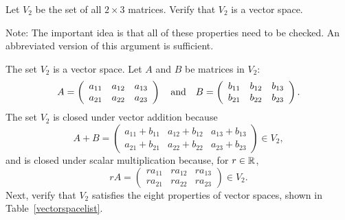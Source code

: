 \documentclass{ximera}
\begin{document}
\begin{exercise} \label{c5.1.2}
Let $V_2$ be the set of all $2\times 3$ matrices.   Verify that
$V_2$ is a vector space.

\begin{solution}
{\color{red}Note: The important idea is that all of these properties need to be checked.  An abbreviated version of this argument is sufficient.}

The set $V_2$ is a vector space.
Let $A$ and $B$ be matrices in $V_2$:
\[
A = \left(\begin{array}{rrr} a_{11} & a_{12} & a_{13} \\
a_{21} & a_{22} & a_{23} \end{array}\right) \quad\mbox{and}\quad
B = \left(\begin{array}{rrr} b_{11} & b_{12} & b_{13} \\
b_{21} & b_{22} & b_{23} \end{array}\right).
\]
The set $V_2$ is closed under vector addition because
\[
A + B
= \left(\begin{array}{rrr} a_{11} + b_{11} & a_{12} + b_{12} &
a_{13} + b_{13} \\ a_{21} + b_{21} & a_{22} + b_{22} &
a_{23} + b_{23} \end{array}\right) \in V_2,
\]
and is closed under scalar multiplication because, for $r \in \mbox{$\mathbb{R}$}$,
\[
rA = \left(\begin{array}{rrr} ra_{11} & ra_{12} & ra_{13} \\
ra_{21} & ra_{22} & ra_{23} \end{array}\right) \in V_2.
\]
Next, verify that $V_2$ satisfies the eight properties of vector
spaces, shown in Table~\ref{vectorspacelist}.


\end{solution}
\end{exercise}
\end{document}
